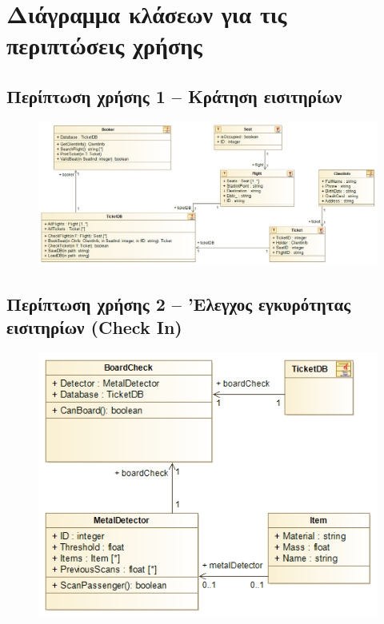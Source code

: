\documentclass[12pt]{article}
\begin{document}
\section{Διάγραμμα κλάσεων για τις περιπτώσεις χρήσης}

\subsection{Περίπτωση χρήσης 1 -- Κράτηση εισιτηρίων}

\begin{figure}[H]
	\centering
	\includegraphics[width=\linewidth]{./res/UC1_Impl.png}
\end{figure}

\subsection{Περίπτωση χρήσης 2 -- 'Ελεγχος εγκυρότητας εισιτηρίων (Check In)}

\begin{figure}[H]
	\centering
	\includegraphics[width=\linewidth]{./res/UC2_Impl.png}
\end{figure}
\end{document}
